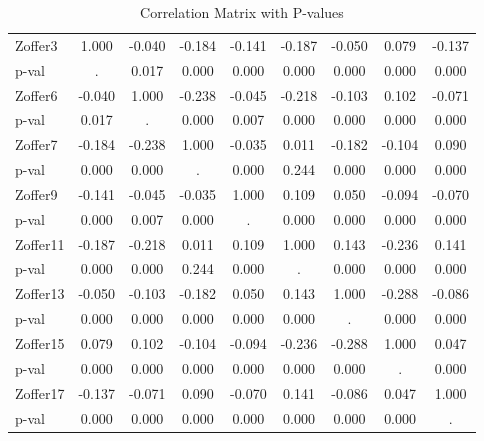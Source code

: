 \begin{table}[htbp]
\centering
\begin{tabular}{l*{8}{c}}
\toprule
\midrule
Zoffer3     &       1.000&      -0.040&      -0.184&      -0.141&      -0.187&      -0.050&       0.079&      -0.137\\
p-val       &           .&       0.017&       0.000&       0.000&       0.000&       0.000&       0.000&       0.000\\
Zoffer6     &      -0.040&       1.000&      -0.238&      -0.045&      -0.218&      -0.103&       0.102&      -0.071\\
p-val       &       0.017&           .&       0.000&       0.007&       0.000&       0.000&       0.000&       0.000\\
Zoffer7     &      -0.184&      -0.238&       1.000&      -0.035&       0.011&      -0.182&      -0.104&       0.090\\
p-val       &       0.000&       0.000&           .&       0.000&       0.244&       0.000&       0.000&       0.000\\
Zoffer9     &      -0.141&      -0.045&      -0.035&       1.000&       0.109&       0.050&      -0.094&      -0.070\\
p-val       &       0.000&       0.007&       0.000&           .&       0.000&       0.000&       0.000&       0.000\\
Zoffer11    &      -0.187&      -0.218&       0.011&       0.109&       1.000&       0.143&      -0.236&       0.141\\
p-val       &       0.000&       0.000&       0.244&       0.000&           .&       0.000&       0.000&       0.000\\
Zoffer13    &      -0.050&      -0.103&      -0.182&       0.050&       0.143&       1.000&      -0.288&      -0.086\\
p-val       &       0.000&       0.000&       0.000&       0.000&       0.000&           .&       0.000&       0.000\\
Zoffer15    &       0.079&       0.102&      -0.104&      -0.094&      -0.236&      -0.288&       1.000&       0.047\\
p-val       &       0.000&       0.000&       0.000&       0.000&       0.000&       0.000&           .&       0.000\\
Zoffer17    &      -0.137&      -0.071&       0.090&      -0.070&       0.141&      -0.086&       0.047&       1.000\\
p-val       &       0.000&       0.000&       0.000&       0.000&       0.000&       0.000&       0.000&           .\\
\bottomrule
\end{tabular}
\caption{Correlation Matrix with P-values}
\end{table}
